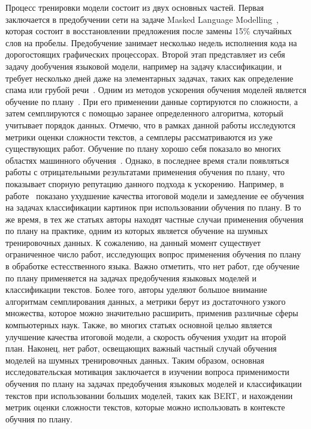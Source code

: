 \documentclass{spbau-diploma}
\begin{document}
Процесс тренировки модели состоит из двух основных частей. Первая заключается в предобучении сети на задаче Masked Language Modelling~\cite{devlin2018bert}, которая состоит в восстановлении предложения после замены 15\% случайных слов на пробелы. Предобучение занимает несколько недель исполнения кода на дорогостоящих графических процессорах. Второй этап представляет из себя задачу дообучения языковой модели, например на задачу классификации, и требует несколько дней даже на элементарных задачах, таких как определение спама или грубой речи~\cite{gertner2019mitre}. Одним из методов ускорения обучения моделей является обучение по плану~\cite{bengio2009curriculum}. При его применении данные сортируются по сложности, а затем семплируются с помощью заранее определенного алгоритма, который учитывает порядок данных. Отмечю, что в рамках данной работы исследуются метрики оценки сложности текстов, а семплеры рассматриваются из уже существующих работ. Обучение по плану хорошо себя показало во многих областях машинного обучения~\cite{narvekar2020curriculum, hacohen2019power, mermer2017scalable}. Однако, в последнее время стали появляться работы с отрицательными результатами применения обучения по плану, что показывает спорную репутацию данного подхода к ускорению. Например, в работе~\cite{wu2020curricula} показано ухудшение качества итоговой модели и замедление ее обучения на задачах классификации картинок при использовании обучения по плану. В то же время, в тех же статьях авторы находят частные случаи применения обучения по плану на практике, одним из которых является обучение на шумных тренировочных данных. К сожалению, на данный момент существует ограниченное число работ, исследующих вопрос применения обучения по плану в обработке естесственного языка. Важно отметить, что нет работ, где обучение по плану применяется на задачах предобучения языковых моделей и классификации текстов. Более того, авторы уделяют большое внимание алгоритмам семплирования данных, а метрики берут из достаточного узкого множества, которое можно значительно расширить, применив различные сферы компьютерных наук. Также, во многих статьях основной целью является улучшение качества итоговой модели, а скорость обучения уходит на второй план. Наконец, нет работ, освещающих важный частный случай обучения моделей на шумных тренировочных данных. Таким образом, основная исследовательская мотивация заключается в изучении вопроса применимости обучения по плану на задачах предобучения языковых моделей и классификации текстов при использовании больших моделей, таких как BERT, и нахождении метрик оценки сложности текстов, которые можно использовать в контексте обучния по плану.
\end{document}
